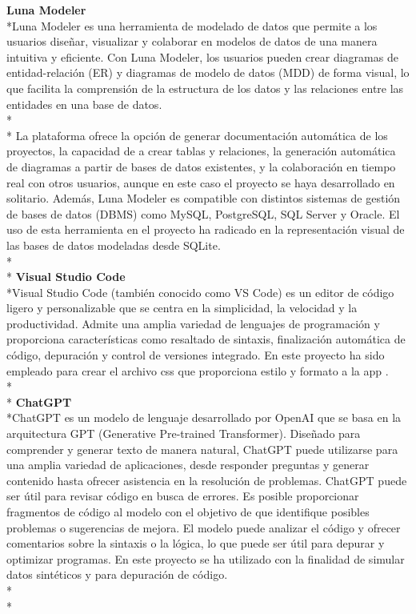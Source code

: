 \documentclass[a4paper,12pt,twoside]{memoir}
\begin{document}
\textbf{Luna Modeler}\\*Luna Modeler es una herramienta de modelado de datos que permite a los usuarios diseñar, visualizar y colaborar en modelos de datos de una manera intuitiva y eficiente. Con Luna Modeler, los usuarios pueden crear diagramas de entidad-relación (ER) y diagramas de modelo de datos (MDD) de forma visual, lo que facilita la comprensión de la estructura de los datos y las relaciones entre las entidades en una base de datos.\\*\\* La plataforma ofrece la opción de generar documentación automática de los proyectos, la capacidad de a crear tablas y relaciones, la generación automática de diagramas a partir de bases de datos existentes, y la colaboración en tiempo real con otros usuarios, aunque en este caso el proyecto se haya desarrollado en solitario. Además, Luna Modeler es compatible con distintos sistemas de gestión de bases de datos (DBMS) como MySQL, PostgreSQL, SQL Server y Oracle. El uso de esta herramienta en el proyecto ha radicado en la representación visual de las bases de datos modeladas desde SQLite.\cite{luna_modeler_website}\\*\\*
\textbf{Visual Studio Code}\\*Visual Studio Code (también conocido como VS Code) es un editor de código ligero y personalizable que se centra en la simplicidad, la velocidad y la productividad. Admite una amplia variedad de lenguajes de programación y proporciona características como resaltado de sintaxis, finalización automática de código, depuración y control de versiones integrado. En este proyecto ha sido empleado para crear el archivo css que proporciona estilo y formato a la app \cite{microsoft2021}.\\*\\*
\textbf{ChatGPT}\\*ChatGPT es un modelo de lenguaje desarrollado por OpenAI que se basa en la arquitectura GPT (Generative Pre-trained Transformer). Diseñado para comprender y generar texto de manera natural, ChatGPT puede utilizarse para una amplia variedad de aplicaciones, desde responder preguntas y generar contenido hasta ofrecer asistencia en la resolución de problemas. ChatGPT puede ser útil para revisar código en busca de errores. Es posible proporcionar fragmentos de código al modelo con el objetivo de que identifique posibles problemas o sugerencias de mejora. El modelo puede analizar el código y ofrecer comentarios sobre la sintaxis o la lógica, lo que puede ser útil para depurar y optimizar programas\cite{chatgpt_doc}. En este proyecto se ha utilizado con la finalidad de simular datos sintéticos y para depuración de código.\\*\\*
\end{document}
